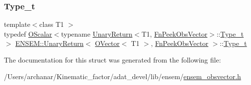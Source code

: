\subsubsection{\texorpdfstring{Type\_t}{Type\_t}\hspace{0.1cm}{\footnotesize\ttfamily [2/2]}}
{\footnotesize\ttfamily template$<$class T1 $>$ \\
typedef \mbox{\hyperlink{classENSEM_1_1OScalar}{O\+Scalar}}$<$typename \mbox{\hyperlink{structENSEM_1_1UnaryReturn}{Unary\+Return}}$<$T1, \mbox{\hyperlink{structENSEM_1_1FnPeekObsVector}{Fn\+Peek\+Obs\+Vector}}$>$\+::\mbox{\hyperlink{structENSEM_1_1UnaryReturn_3_01OVector_3_01T1_01_4_00_01FnPeekObsVector_01_4_a389e8e049203dcaaa7ef75769364c944}{Type\+\_\+t}}$>$ \mbox{\hyperlink{structENSEM_1_1UnaryReturn}{E\+N\+S\+E\+M\+::\+Unary\+Return}}$<$ \mbox{\hyperlink{classENSEM_1_1OVector}{O\+Vector}}$<$ T1 $>$, \mbox{\hyperlink{structENSEM_1_1FnPeekObsVector}{Fn\+Peek\+Obs\+Vector}} $>$\+::\mbox{\hyperlink{structENSEM_1_1UnaryReturn_3_01OVector_3_01T1_01_4_00_01FnPeekObsVector_01_4_a389e8e049203dcaaa7ef75769364c944}{Type\+\_\+t}}}



The documentation for this struct was generated from the following file\+:\begin{DoxyCompactItemize}
\item 
/\+Users/archanar/\+Kinematic\+\_\+factor/adat\+\_\+devel/lib/ensem/\mbox{\hyperlink{lib_2ensem_2ensem__obsvector_8h}{ensem\+\_\+obsvector.\+h}}\end{DoxyCompactItemize}
